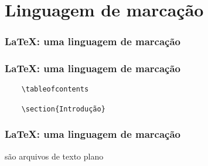 \section[\LaTeX: uma linguagem de marcação]{Linguagem de marcação}

\begin{frame}
  \frametitle{\LaTeX: uma linguagem de marcação}
  \LARGE
\end{frame}

\begin{frame}[fragile]
  \frametitle{\LaTeX: uma linguagem de marcação}
  \begin{verbatim}
    \tableofcontents

    \section{Introdução}
  \end{verbatim}
\end{frame}

\begin{frame}
  \frametitle{\LaTeX: uma linguagem de marcação}
  \LARGE
   são arquivos de texto plano
\end{frame}
